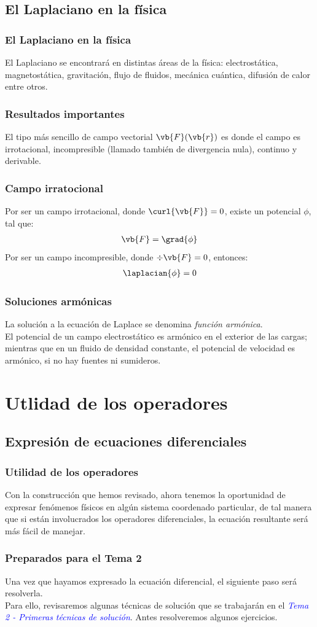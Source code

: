 \subsection{El Laplaciano en la física}
\begin{frame}
\frametitle{El Laplaciano en la física}
El Laplaciano se encontrará en distintas áreas de la física: electrostática, magnetostática, gravitación, flujo de fluidos, mecánica cuántica, difusión de calor entre otros.
\end{frame}
\begin{frame}
\frametitle{Resultados importantes}
El tipo más sencillo de campo vectorial $\vb{F}(\vb{r})$ es donde el campo es irrotacional, incompresible (llamado también de divergencia nula), continuo y derivable.
\end{frame}
\begin{frame}
\frametitle{Campo irratocional}
Por ser un campo irrotacional, donde $\curl{\vb{F}} = 0$, existe un potencial $\phi$, tal que:
\begin{align*}
\vb{F} = \grad{\phi}
\end{align*}
\pause
Por ser un campo incompresible, donde $\div{\vb{F}} = 0$, entonces:
\begin{align*}
\laplacian{\phi} = 0
\end{align*}
\end{frame}
\begin{frame}
\frametitle{Soluciones armónicas}
La solución a la ecuación de Laplace se denomina \emph{función armónica}.
\\
\bigskip
\pause
El potencial de un campo electrostático es armónico en el exterior de las cargas; mientras que en un fluido de densidad constante, el potencial de velocidad es armónico, si no hay fuentes ni sumideros.
\end{frame}
\section{Utlidad de los operadores}
\subsection{Expresión de ecuaciones diferenciales}
\begin{frame}
\frametitle{Utilidad de los operadores}
Con la construcción que hemos revisado, ahora tenemos la oportunidad de expresar fenómenos físicos en algún sistema coordenado particular, de tal manera que si están involucrados los operadores diferenciales, la ecuación resultante será más fácil de manejar.
\end{frame}
\begin{frame}
\frametitle{Preparados para el Tema 2}
Una vez que hayamos expresado la ecuación diferencial, el siguiente paso será resolverla.
\\
\bigskip
\pause
Para ello, revisaremos algunas técnicas de solución que se trabajarán en el \emph{\textcolor{blue}{Tema 2 - Primeras técnicas de solución}}. Antes resolveremos algunos ejercicios.
\end{frame}
